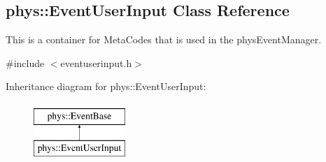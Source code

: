 \hypertarget{classphys_1_1EventUserInput}{
\subsection{phys::EventUserInput Class Reference}
\label{d7/df5/classphys_1_1EventUserInput}
}


This is a container for MetaCodes that is used in the physEventManager.  




{\ttfamily \#include $<$eventuserinput.h$>$}

Inheritance diagram for phys::EventUserInput:\begin{figure}[H]
\begin{center}
\leavevmode
\includegraphics[height=2.000000cm]{d7/df5/classphys_1_1EventUserInput}
\end{center}
\end{figure}
